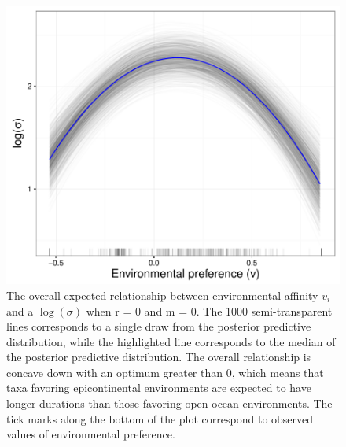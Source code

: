 \documentclass{article}
\begin{document}
\begin{figure}[ht]
  \centering
  \includegraphics[height = 0.5\textheight,width=\textwidth,keepaspectratio=true]{figure/env_effect}
  \caption{The overall expected relationship between environmental affinity \(v_{i}\) and a \(\log(\sigma)\) when r = 0 and m = 0. The 1000 semi-transparent lines corresponds to a single draw from the posterior predictive distribution, while the highlighted line corresponds to the median of the posterior predictive distribution. The overall relationship is concave down with an optimum greater than 0, which means that taxa favoring epicontinental environments are expected to have longer durations than those favoring open-ocean environments. The tick marks along the bottom of the plot correspond to observed values of environmental preference.}
  \label{fig:env_mean}
\end{figure}
\end{document}
